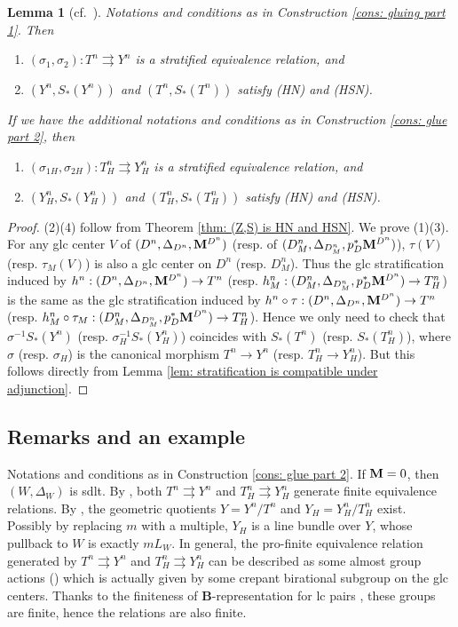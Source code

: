 \documentclass[11pt]{amsart}
\numberwithin{equation}{section}
\newcommand{\Mm}{{\bf{M}}}
\newtheorem{lem}[thm]{Lemma}
\theoremstyle{definition}
\theoremstyle{definition}
\theoremstyle{definition}
\begin{document}
\begin{lem}[{cf.~\cite[Lemma 3.11]{HX13}}]\label{lem: induced
  relation is stratified}
  Notations and conditions as in Construction \ref{cons: gluing part 1}. Then
  \begin{enumerate}
    \item $(\sigma_1,\sigma_2): T^n\rightrightarrows Y^n$ is a
      stratified equivalence relation, and
    \item $(Y^n,S_*(Y^n))$ and $(T^n,S_*(T^n))$ satisfy (HN) and (HSN).
  \end{enumerate}
  If we have the additional notations and conditions as in
  Construction \ref{cons: glue part 2}, then
  \begin{enumerate}
    \item[(3)] $(\sigma_{1H},\sigma_{2H}): T^n_H\rightrightarrows
      Y^n_H$ is a stratified equivalence relation, and
    \item[(4)] $(Y^n_H,S_*(Y^n_H))$ and $(T^n_H,S_*(T^n_H))$ satisfy
      (HN) and (HSN).
  \end{enumerate}
\end{lem}
\begin{proof}
  (2)(4) follow from Theorem \ref{thm: (Z,S) is HN and HSN}. We prove
  (1)(3). For any glc center $V$ of $(D^n,\Delta_{D^n},\Mm^{D^n})$
  (resp. of $(D^n_M,\Delta_{D^n_M},p^*_D\Mm^{D^n})$), $\tau(V)$
  (resp. $\tau_M(V)$) is also a glc center on $D^n$ (resp. $D^n_M$).
  Thus the glc stratification induced by $h^n:
  (D^n,\Delta_{D^n},\Mm^{D^n})\to T^n$ (resp. $h^n_M:
  (D^n_M,\Delta_{D^n_M},p_D^*\Mm^{D^n})\to T^n_H$) is the same as the
  glc stratification induced by
  $h^n\circ\tau:(D^n,\Delta_{D^n},\Mm^{D^n})\to T^n$ (resp.
    $h^n_M\circ\tau_M: (D^n_M,\Delta_{D^n_M},p_D^*\Mm^{D^n})\to
  T^n_H$). Hence we only need to check that $\sigma^{-1}S_*(Y^n)$
  (resp. $\sigma_H^{-1}S_*(Y^n_H)$) coincides with $S_*(T^n)$ (resp.
  $S_*(T^n_H)$), where $\sigma$ (resp. $\sigma_H$) is the canonical
  morphism $T^n\to Y^n$ (resp. $T^n_H\to Y^n_H$). But this follows
  directly from Lemma \ref{lem: stratification is compatible under adjunction}.
\end{proof}

\subsection{Remarks and an example}
Notations and conditions as in Construction \ref{cons: glue part 2}.
If $\Mm=0$, then $(W,\Delta_W)$ is sdlt. By \cite[Section 4]{HX16},
both $T^n\rightrightarrows Y^n$ and $T^n_H\rightrightarrows Y^n_H$
generate finite equivalence relations. By \cite[Theorem 9.21]{Kol13},
the geometric quotients $Y=Y^n/T^n$ and $Y_H=Y^n_H/T^n_H$ exist.
Possibly by replacing $m$ with a multiple, $Y_H$ is a line bundle
over $Y$, whose pullback to $W$ is exactly $mL_W$. In general, the
pro-finite equivalence relation generated by $T^n\rightrightarrows
Y^n$ and $T^n_H\rightrightarrows Y^n_H$ can be described as some
almost group actions (\cite[Definition 9.32]{Kol13}) which is
actually given by some crepant birational subgroup on the glc
centers. Thanks to the finiteness of {\bf B}-representation for lc
pairs \cite{HX13,FG14}, these groups are finite, hence the relations
are also finite.
\end{document}
